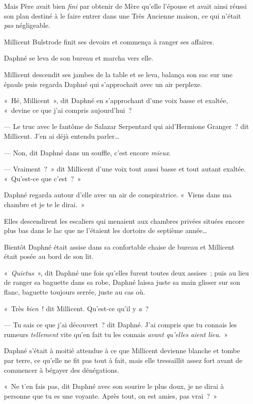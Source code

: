 Mais Père avait bien \emph{fini} par obtenir de Mère qu'elle l'épouse et avait ainsi réussi son plan destiné à le faire entrer dans une Très Ancienne maison, ce qui n'était \emph{pas} négligeable.

Millicent Bulstrode finit ses devoirs et commença à ranger ses affaires.

Daphné se leva de son bureau et marcha vers elle.

Millicent descendit ses jambes de la table et se leva, balança son sac sur une épaule puis regarda Daphné qui s'approchait avec un air perplexe.

«~Hé, Millicent~», dit Daphné en s'approchant d'une voix basse et exaltée, «~devine ce que j'ai compris aujourd'hui~?

--- Le truc avec le fantôme de Salazar Serpentard qui aid'Hermione Granger~? dit Millicent. J'en ai déjà entendu parler…

--- Non, dit Daphné dans un souffle, c'est encore \emph{mieux}.

--- Vraiment~?~» dit Millicent d'une voix tout aussi basse et tout autant exaltée. «~Qu'est-ce que c'est~?~»

Daphné regarda autour d'elle avec un air de conspiratrice. «~Viens dans ma chambre et je te le dirai.~»

Elles descendirent les escaliers qui menaient aux chambres privées situées encore plus bas dans le lac que ne l'étaient les dortoirs de septième année…

Bientôt Daphné était assise dans sa confortable chaise de bureau et Millicent était posée au bord de son lit.

«~\emph{Quietus}~», dit Daphné une fois qu'elles furent toutes deux assises~; puis au lieu de ranger sa baguette dans sa robe, Daphné laissa juste sa main glisser sur son flanc, baguette toujours serrée, juste au cas où.

«~Très \emph{bien}~! dit Millicent. Qu'est-ce qu'il y \emph{a}~?

--- Tu sais ce que j'ai découvert~? dit Daphné. J'ai compris que tu connais les rumeurs \emph{tellement} vite qu'en fait tu les connais \emph{avant qu'elles aient lieu}.~»

Daphné s'était à moitié attendue à ce que Millicent devienne blanche et tombe par terre, ce qu'elle ne fit pas tout à fait, mais elle tressaillit assez fort avant de commencer à bégayer des dénégations.

«~Ne t'en fais pas, dit Daphné avec son sourire le plus doux, je ne dirai à personne que tu es une voyante. Après tout, on est amies, pas vrai~?~»

